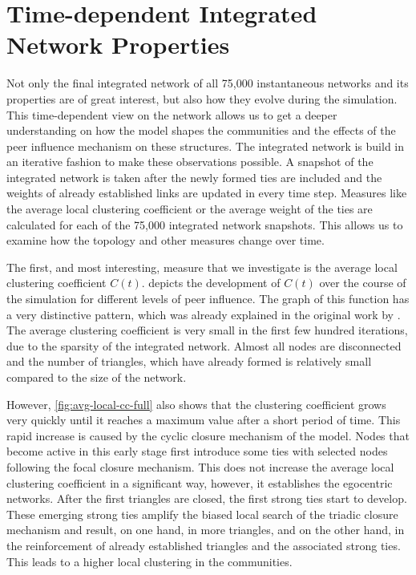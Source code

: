 

\section{Time-dependent Integrated Network Properties}
\label{sec:integrated-network-properties}

Not only the final integrated network of all 75,000 instantaneous networks and its properties are of great interest, but also how they evolve during the simulation.
This time-dependent view on the network allows us to get a deeper understanding on how the model shapes the communities and the effects of the peer influence mechanism on these structures.
The integrated network is build in an iterative fashion to make these observations possible.
A snapshot of the integrated network is taken after the newly formed ties are included and the weights of already established links are updated in every time step.
Measures like the average local clustering coefficient or the average weight of the ties are calculated for each of the 75,000 integrated network snapshots.
This allows us to examine how the topology and other measures change over time.

The first, and most interesting, measure that we investigate is the average local clustering coefficient \( C(t) \).
 depicts the development of \( C(t) \) over the course of the simulation for different levels of peer influence.
The graph of this function has a very distinctive pattern, which was already explained in the original work by \citet{Laurent2015}.
The average clustering coefficient is very small in the first few hundred iterations, due to the sparsity of the integrated network.
Almost all nodes are disconnected and the number of triangles, which have already formed is relatively small compared to the size of the network.

However, \cref{fig:avg-local-cc-full} also shows that the clustering coefficient grows very quickly until it reaches a maximum value after a short period of time.
This rapid increase is caused by the cyclic closure mechanism of the model.
Nodes that become active in this early stage first introduce some ties with selected nodes following the focal closure mechanism.
This does not increase the average local clustering coefficient in a significant way, however, it establishes the egocentric networks.
After the first triangles are closed, the first strong ties start to develop.
These emerging strong ties amplify the biased local search of the triadic closure mechanism and result, on one hand, in more triangles, and on the other hand, in the reinforcement of already established triangles and the associated strong ties.
This leads to a higher local clustering in the communities.

